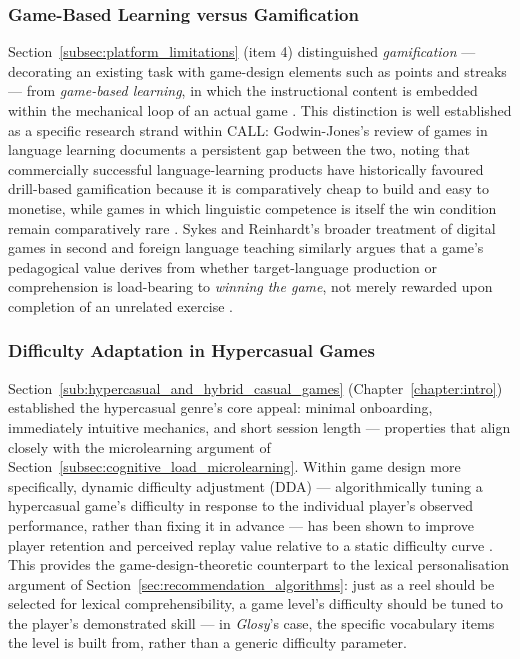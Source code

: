         \subsubsection{Game-Based Learning versus Gamification}
        \label{subsubsec:gbl_vs_gamification}
        Section~\ref{subsec:platform_limitations} (item 4) distinguished \emph{gamification} --- decorating an existing task with game-design elements such as points and streaks \cite{deterding2011gamification} --- from \emph{game-based learning}, in which the instructional content is embedded within the mechanical loop of an actual game \cite{plass2015foundations}. This distinction is well established as a specific research strand within CALL: Godwin-Jones's review of games in language learning documents a persistent gap between the two, noting that commercially successful language-learning products have historically favoured drill-based gamification because it is comparatively cheap to build and easy to monetise, while games in which linguistic competence is itself the win condition remain comparatively rare \cite{godwinjones2014games}. Sykes and Reinhardt's broader treatment of digital games in second and foreign language teaching similarly argues that a game's pedagogical value derives from whether target-language production or comprehension is load-bearing to \emph{winning the game}, not merely rewarded upon completion of an unrelated exercise \cite{sykes2013language}.

        \subsubsection{Difficulty Adaptation in Hypercasual Games}
        \label{subsubsec:dda}
        Section~\ref{sub:hypercasual_and_hybrid_casual_games} (Chapter~\ref{chapter:intro}) established the hypercasual genre's core appeal: minimal onboarding, immediately intuitive mechanics, and short session length --- properties that align closely with the microlearning argument of Section~\ref{subsec:cognitive_load_microlearning}. Within game design more specifically, dynamic difficulty adjustment (DDA) --- algorithmically tuning a hypercasual game's difficulty in response to the individual player's observed performance, rather than fixing it in advance --- has been shown to improve player retention and perceived replay value relative to a static difficulty curve \cite{yang2020hyper}. This provides the game-design-theoretic counterpart to the lexical personalisation argument of Section~\ref{sec:recommendation_algorithms}: just as a reel should be selected for lexical comprehensibility, a game level's difficulty should be tuned to the player's demonstrated skill --- in \textit{Glosy}'s case, the specific vocabulary items the level is built from, rather than a generic difficulty parameter.

